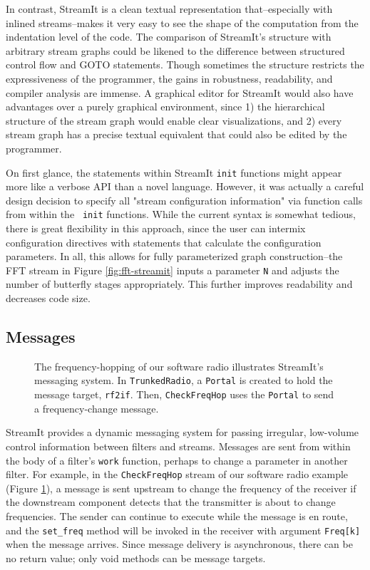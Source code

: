In contrast, StreamIt is a clean textual representation
that--especially with inlined streams--makes it very easy to see the
shape of the computation from the indentation level of the code.  The
comparison of StreamIt's structure with arbitrary stream graphs could
be likened to the difference between structured control flow and GOTO
statements.  Though sometimes the structure restricts the
expressiveness of the programmer, the gains in robustness,
readability, and compiler analysis are immense.  A graphical editor
for StreamIt would also have advantages over a purely graphical
environment, since 1) the hierarchical structure of the stream graph
would enable clear visualizations, and 2) every stream graph has a
precise textual equivalent that could also be edited by the
programmer.

On first glance, the statements within StreamIt {\tt init} functions
might appear more like a verbose API than a novel language.  However,
it was actually a careful design decision to specify all "stream
configuration information" via function calls from within the {\tt
init} functions.  While the current syntax is somewhat tedious, there
is great flexibility in this approach, since the user can intermix
configuration directives with statements that calculate the
configuration parameters.  In all, this allows for fully parameterized
graph construction--the FFT stream in Figure \ref{fig:fft-streamit}
inputs a parameter {\tt N} and adjusts the number of butterfly stages
appropriately.  This further improves readability and decreases code
size.

\subsection{Messages}

\begin{figure}[h]
\vspace{-12pt}
\vspace{-18pt}
\caption{The frequency-hopping of our software radio illustrates StreamIt's messaging system.  In {\tt TrunkedRadio}, a {\tt Portal} is created to hold the message target, {\tt rf2if}.  Then, {\tt CheckFreqHop} uses the {\tt Portal} to send a frequency-change message.
\protect\label{fig:portal-code}}
\vspace{-18pt}
\end{figure}

StreamIt provides a dynamic messaging system for passing irregular,
low-volume control information between filters and streams.  Messages
are sent from within the body of a filter's {\tt work} function,
perhaps to change a parameter in another filter.  For example, in the
{\tt CheckFreqHop} stream of our software radio example (Figure
\ref{fig:portal-code}), a message is sent upstream to change the frequency of
the receiver if the downstream component detects that the transmitter
is about to change frequencies.  The sender can continue to execute
while the message is en route, and the {\tt set\_freq} method will be
invoked in the receiver with argument {\tt Freq[k]} when the message
arrives.  Since message delivery is asynchronous, there can be no
return value; only void methods can be message targets.

